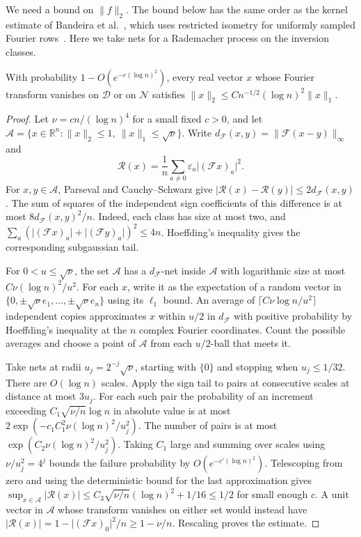 \documentclass[preprints,article,submit,oneauthor]{Definitions/mdpi}
\newcommand{\abs}[1]{\lvert #1\rvert}
\newcommand{\norm}[1]{\lVert #1\rVert}
\begin{document}
We need a bound on \(\norm f_2\). The bound below has the same order
as the kernel estimate of Bandeira et al.~\cite{BBDFKK}, which uses
restricted isometry for uniformly sampled Fourier rows~\cite{HR}.
Here we take nets for a Rademacher process on the inversion classes.

\begin{Lemma}\label{lem:kernel}
With probability \(1-O(e^{-c(\log n)^2})\), every real vector \(x\)
whose Fourier transform vanishes on \(\mathcal D\) or on \(\mathcal N\)
satisfies \(\norm x_2\le C n^{-1/2}(\log n)^2\norm x_1\).
\end{Lemma}

\begin{proof}
Let \(\nu=cn/(\log n)^4\) for a small fixed \(c>0\), and let
\(\mathcal A=\{x\in\mathbb R^n:\norm x_2\le1,\ \norm x_1\le\sqrt{\nu}\}\).
Write \(d_{\mathcal F}(x,y)=\norm{\mathcal F(x-y)}_\infty\) and
\[
 \mathcal R(x)=\frac1n\sum_{a\ne0}\varepsilon_a\abs{(\mathcal F x)_a}^2.
\]
For \(x,y\in\mathcal A\), Parseval and Cauchy--Schwarz give
\(\abs{\mathcal R(x)-\mathcal R(y)}\le2d_{\mathcal F}(x,y)\). The sum of
squares of the independent sign coefficients of this difference is
at most \(8d_{\mathcal F}(x,y)^2/n\).
Indeed, each class has size at most two, and
\(\sum_a (\abs{(\mathcal F x)_a}+\abs{(\mathcal F y)_a})^2\le4n\).
Hoeffding's inequality gives the corresponding subgaussian tail.

For \(0<u\le\sqrt{\nu}\), the set \(\mathcal A\) has a \(d_{\mathcal F}\)-net inside
\(\mathcal A\) with logarithmic size at most \(C \nu(\log n)^2/u^2\).
For each \(x\), write it as the expectation of a random vector in
\(\{0,\pm\sqrt{\nu} e_1,\ldots,\pm\sqrt{\nu} e_n\}\) using its \(\ell_1\)
bound. An average of \(\lceil C \nu\log n/u^2\rceil\) independent
copies approximates \(x\) within \(u/2\) in \(d_{\mathcal F}\) with positive
probability by Hoeffding's inequality at the \(n\) complex Fourier
coordinates. Count the possible averages and choose a point of
\(\mathcal A\) from each \(u/2\)-ball that meets it.

Take nets at radii \(u_j=2^{-j}\sqrt{\nu}\), starting with \(\{0\}\) and
stopping when \(u_j\le1/32\). There are \(O(\log n)\) scales. Apply the
sign tail to pairs at consecutive scales at distance at most \(3u_j\).
For each such pair the probability of an increment exceeding
\(C_1\sqrt{\nu/n}\log n\) in absolute value is at most
\(2\exp(-c_1 C_1^2 \nu(\log n)^2/u_j^2)\).
The number of pairs is at most \(\exp(C_2\nu(\log n)^2/u_j^2)\).
Taking \(C_1\) large and summing over scales using \(\nu/u_j^2=4^j\)
bounds the failure probability by \(O(e^{-c'(\log n)^2})\).
Telescoping from zero and using the deterministic bound for the
last approximation gives
\(\sup_{x\in\mathcal A}\abs{\mathcal R(x)}\le C_3\sqrt{\nu/n}(\log n)^2+1/16\le1/2\)
for small enough \(c\). A unit vector in \(\mathcal A\) whose transform
vanishes on either set would instead have
\(\abs{\mathcal R(x)}=1-\abs{(\mathcal F x)_0}^2/n\ge1-\nu/n\). Rescaling proves
the estimate.
\end{proof}
\end{document}
